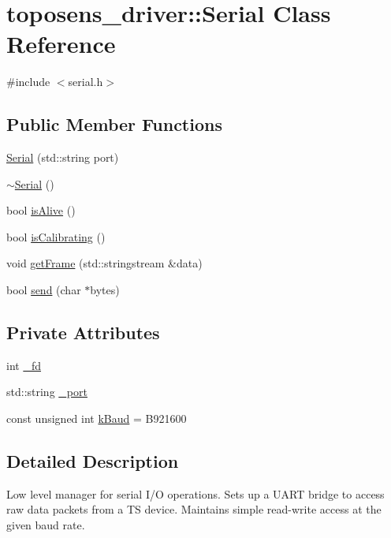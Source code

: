\hypertarget{classtoposens__driver_1_1Serial}{}\section{toposens\+\_\+driver\+:\+:Serial Class Reference}
\label{classtoposens__driver_1_1Serial}


{\ttfamily \#include $<$serial.\+h$>$}

\subsection*{Public Member Functions}
\begin{DoxyCompactItemize}
\item 
\hyperlink{classtoposens__driver_1_1Serial_ab66b3b0aba714ac8332d7453833f4294}{Serial} (std\+::string port)
\item 
\hyperlink{classtoposens__driver_1_1Serial_a7970e34fd2b626baa989a7a08e3b2e7f}{$\sim$\+Serial} ()
\item 
bool \hyperlink{classtoposens__driver_1_1Serial_a43c68993fde1277eff277428d17b47c0}{is\+Alive} ()
\item 
bool \hyperlink{classtoposens__driver_1_1Serial_a4837c845aedc74cc1b9a62acb71b0cef}{is\+Calibrating} ()
\item 
void \hyperlink{classtoposens__driver_1_1Serial_a7e1ba7bccecbc978f6e16104ec459e29}{get\+Frame} (std\+::stringstream \&data)
\item 
bool \hyperlink{classtoposens__driver_1_1Serial_aea7a45dbb1d2edb0b5e60b1cae10584b}{send} (char $\ast$bytes)
\end{DoxyCompactItemize}
\subsection*{Private Attributes}
\begin{DoxyCompactItemize}
\item 
int \hyperlink{classtoposens__driver_1_1Serial_a7b3cfddd56ba457aa617737249e197fa}{\+\_\+fd}
\item 
std\+::string \hyperlink{classtoposens__driver_1_1Serial_a7625dc8f63340fc4ea3e076331c5552c}{\+\_\+port}
\item 
const unsigned int \hyperlink{classtoposens__driver_1_1Serial_a383754d17418659020d9f7c221457f5f}{k\+Baud} = B921600
\end{DoxyCompactItemize}


\subsection{Detailed Description}
Low level manager for serial I/O operations. Sets up a U\+A\+RT bridge to access raw data packets from a TS device. Maintains simple read-\/write access at the given baud rate. 

